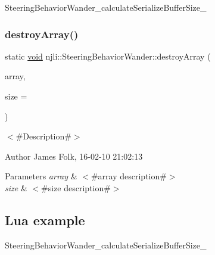 \begin{DoxyCodeInclude}
\end{DoxyCodeInclude}
Steering\+Behavior\+Wander\+\_\+calculate\+Serialize\+Buffer\+Size\+\_\+ \mbox{\label{classnjli_1_1_steering_behavior_wander_ae55c6adb6bde81015b70986049ffece2}} 
\subsubsection{\texorpdfstring{destroy\+Array()}{destroyArray()}}
{\footnotesize\ttfamily static \mbox{\hyperlink{_thread_8h_af1e856da2e658414cb2456cb6f7ebc66}{void}} njli\+::\+Steering\+Behavior\+Wander\+::destroy\+Array (\begin{DoxyParamCaption}\item[{\mbox{\hyperlink{classnjli_1_1_steering_behavior_wander}{Steering\+Behavior\+Wander}} $\ast$$\ast$}]{array,  }\item[{const \mbox{\hyperlink{_util_8h_a10e94b422ef0c20dcdec20d31a1f5049}{u32}}}]{size = {} }\end{DoxyParamCaption})\hspace{0.3cm}{\ttfamily [static]}}



$<$\#\+Description\#$>$ 

\begin{DoxyAuthor}{Author}
James Folk, 16-\/02-\/10 21\+:02\+:13
\end{DoxyAuthor}

\begin{DoxyParams}{Parameters}
{\em array} & $<$\#array description\#$>$ \\
\hline
{\em size} & $<$\#size description\#$>$\\
\hline
\end{DoxyParams}
\hypertarget{classnjli_1_1_steering_behavior_wander_ex1}{}\subsection{Lua example}\label{classnjli_1_1_steering_behavior_wander_ex1}

\begin{DoxyCodeInclude}
\end{DoxyCodeInclude}
Steering\+Behavior\+Wander\+\_\+calculate\+Serialize\+Buffer\+Size\+\_\+ \mbox{\label{classnjli_1_1_steering_behavior_wander_a5970ae94b72e1d962643faa34029d0de}} 
